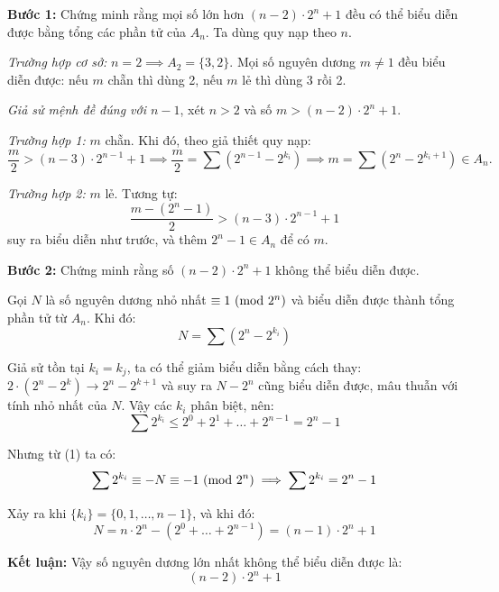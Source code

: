 \documentclass[../01-divisibility.tex]{subfiles}
\begin{document}
\begin{soln}
	\textbf{Bước 1:} Chứng minh rằng mọi số lớn hơn \( (n - 2) \cdot 2^n + 1 \) đều có thể biểu diễn được bằng tổng các phần tử của \( A_n \).
	Ta dùng quy nạp theo \( n \).

	\textit{Trường hợp cơ sở:} \( n = 2 \implies A_2 = \{3, 2\} \).  
	Mọi số nguyên dương \( m \neq 1 \) đều biểu diễn được:  
	nếu \( m \) chẵn thì dùng 2, nếu \( m \) lẻ thì dùng 3 rồi 2.

	\textit{Giả sử mệnh đề đúng với \( n - 1 \)}, xét \( n > 2 \) và số \( m > (n - 2) \cdot 2^n + 1 \).

	\textit{Trường hợp 1:} \( m \) chẵn. Khi đó, theo giả thiết quy nạp:
	\[
		\frac{m}{2} > (n - 3) \cdot 2^{n - 1} + 1
		\implies \frac{m}{2} = \sum (2^{n-1} - 2^{k_i}) \implies m = \sum (2^n - 2^{k_i + 1}) \in A_n.
	\]

	\textit{Trường hợp 2:} \( m \) lẻ. Tương tự:
	\[
		\frac{m - (2^n - 1)}{2} > (n - 3) \cdot 2^{n - 1} + 1
	\]
	suy ra biểu diễn như trước, và thêm \( 2^n - 1 \in A_n \) để có \( m \).

	\textbf{Bước 2:} Chứng minh rằng số \( (n - 2) \cdot 2^n + 1 \) không thể biểu diễn được.

	Gọi \( N \) là số nguyên dương nhỏ nhất \( \equiv 1 \ (\mathrm{mod}\ 2^n) \) và biểu diễn được thành tổng phần tử từ \( A_n \). Khi đó:
	\[
		N = \sum (2^n - 2^{k_i}) \tag{1}
	\]

	Giả sử tồn tại \( k_i = k_j \), ta có thể giảm biểu diễn bằng cách thay: $2 \cdot (2^n - 2^k) \to 2^n - 2^{k + 1}$
	và suy ra \( N - 2^n \) cũng biểu diễn được, mâu thuẫn với tính nhỏ nhất của \( N \).
	Vậy các \( k_i \) phân biệt, nên:
	\[
		\sum 2^{k_i} \leq 2^0 + 2^1 + \dots + 2^{n-1} = 2^n - 1
	\]
	
	Nhưng từ (1) ta có:
	\[
		\sum 2^{k_i} \equiv -N \equiv -1 \ (\mathrm{mod}\ 2^n) \implies \sum 2^{k_i} = 2^n - 1
	\]

	Xảy ra khi \( \{k_i\} = \{0, 1, \dots, n-1\} \), và khi đó:
	\[
		N = n \cdot 2^n - (2^0 + \dots + 2^{n-1}) = (n - 1) \cdot 2^n + 1
	\]

	\textbf{Kết luận:} Vậy số nguyên dương lớn nhất không thể biểu diễn được là:
	\[
		(n - 2) \cdot 2^n + 1
	\]
\end{soln}

\end{document}
